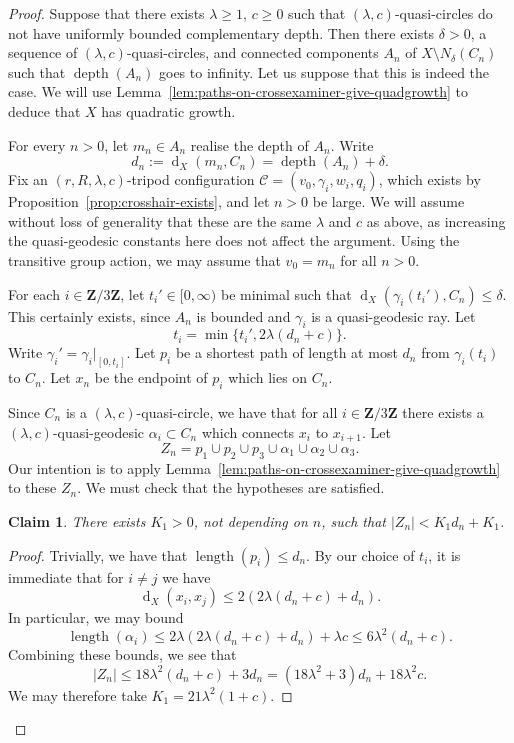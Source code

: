 \documentclass[11pt,a4paper]{amsart}
\DeclareMathOperator{\length}{length}
\DeclareMathOperator{\dist}{d}
\newcommand{\Z}{\mathbf{Z}}
\newtheorem{claim}[theorem]{Claim}
\theoremstyle{definition}
\newcommand{\crosshair}{\mathcal{C}}
\DeclareMathOperator{\depth}{depth}
\begin{document}
\begin{proof}
    Suppose that there exists $\lambda \geq 1$, $c \geq 0$ such that $(\lambda,c)$-quasi-circles do not have uniformly bounded complementary depth.  Then there exists $\delta > 0$, a sequence of $(\lambda, c)$-quasi-circles, and connected components $A_n$ of $X \setminus N_\delta(C_n)$ such that $\depth(A_n)$ goes to infinity. Let us suppose that this is indeed the case. 
    We will use Lemma~\ref{lem:paths-on-crossexaminer-give-quadgrowth} to deduce that $X$ has quadratic growth.
    
    For every $n > 0$, let $m_n \in A_n$ realise the depth of $A_n$. Write 
    $$
    d_n := \dist_X(m_n, C_n) = \depth(A_n)   + \delta.
    $$
    Fix an $(r,R,\lambda,c)$-tripod configuration $\crosshair = (v_0,\gamma_i, w_i, q_i)$, which exists by Proposition~\ref{prop:crosshair-exists}, and let $n > 0$ be large. We will assume without loss of generality that these are the same $\lambda$ and $c$ as above, as increasing the quasi-geodesic constants here does not affect the argument. Using the transitive group action, we may assume that $v_0 = m_n$ for all $n > 0$.

    For each $i \in \Z/3\Z$, let $t_i' \in [0,\infty)$ be minimal such that $\dist_X(\gamma_i(t_i'),C_n) \leq \delta$. This certainly exists, since $A_n$ is bounded and $\gamma_i$ is a quasi-geodesic ray. Let
    $$
    t_i = \min \{t_i',2\lambda(d_n+c)\}. 
    $$
    Write $\gamma_i' = \gamma_i |_{[0,t_i]}$. 
    Let $p_i$ be a shortest path of length at most $d_n$ from $\gamma_i(t_i)$ to $C_n$. Let $x_n$ be the endpoint of $p_i$ which lies on $C_n$. 

    Since $C_n$ is a $(\lambda,c)$-quasi-circle, we have that for all $i \in \Z/3\Z$ there exists a $(\lambda,c)$-quasi-geodesic $\alpha_i \subset C_n$ which connects $x_i$ to $x_{i+1}$. Let
    $$
    Z_n = p_1 \cup p_2 \cup p_3 \cup \alpha_1 \cup \alpha_2 \cup \alpha_3.
    $$
    Our intention is to apply Lemma~\ref{lem:paths-on-crossexaminer-give-quadgrowth} to these $Z_n$. We must check that the hypotheses are satisfied. 

    \begin{claim}
        There exists $K_1 > 0$, not depending on $n$, such that $|Z_n| < K_1 d_n + K_1$. 
    \end{claim}

    \begin{proof}
        Trivially, we have that $\length(p_i) \leq d_n$. By our choice of $t_i$, it is immediate that for $i \neq j$ we have 
        $$
        \dist_X(x_i,x_j) \leq 2(2\lambda (d_n + c) + d_n).
        $$
        In particular, we may bound
        $$
        \length(\alpha_i) \leq 2\lambda(2\lambda (d_n + c) + d_n) + \lambda c \leq 6\lambda^2 (d_n +c).
        $$
        Combining these bounds, we see that 
        $$
        |Z_n| \leq 18 \lambda^2 (d_n + c) + 3d_n = (18\lambda^2 + 3)d_n + 18\lambda^2 c.
        $$
        We may therefore take $K_1 = 21\lambda^2(1+c)$.
    \end{proof}



\end{proof}
\end{document}
